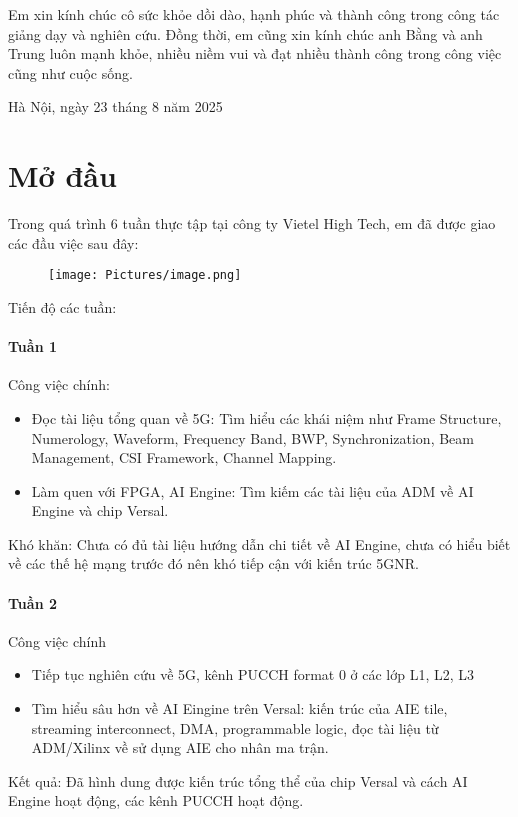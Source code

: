 \documentclass[13pt]{report}
\begin{document}
Em xin kính chúc cô sức khỏe dồi dào, hạnh phúc và thành công trong công tác giảng dạy và nghiên cứu. Đồng thời, em cũng xin kính chúc anh Bằng và anh Trung luôn mạnh khỏe, nhiều niềm vui và đạt nhiều thành công trong công việc cũng như cuộc sống.

\hspace{8cm} Hà Nội, ngày 23 tháng 8 năm 2025


\newpage
\let\cleardoublepage\clearpage
\large
\tableofcontents
\let\cleardoublepage\clearpage
\newpage
{}
\listoffigures 
\newpage
\listoftables

\chapter{Mở đầu}
Trong quá trình 6 tuần thực tập tại công ty Vietel High Tech, em đã được giao các đầu việc sau đây:
\begin{figure}[H]
    \centering
    \texttt{[image: Pictures/image.png]}
\end{figure}
Tiến độ các tuần: 
\subsubsection{Tuần 1}
Công việc chính: 
\begin{itemize}
    \item Đọc tài liệu tổng quan về 5G: Tìm hiểu các khái niệm như Frame Structure, Numerology, Waveform, Frequency Band, BWP, Synchronization, Beam Management, CSI Framework, Channel Mapping.
    \item Làm quen với FPGA, AI Engine: Tìm kiếm các tài liệu của ADM về AI Engine và chip Versal. 
\end{itemize}
Khó khăn: Chưa có đủ tài liệu hướng dẫn chi tiết về AI Engine, chưa có hiểu biết về các thế hệ mạng trước đó nên khó tiếp cận với kiến trúc 5GNR.
\subsubsection{Tuần 2}
Công việc chính
\begin{itemize}
    \item Tiếp tục nghiên cứu về 5G, kênh PUCCH format 0 ở các lớp L1, L2, L3
    \item Tìm hiểu sâu hơn về AI Eingine trên Versal: kiến trúc của AIE tile, streaming interconnect, DMA, programmable logic, đọc tài liệu từ ADM/Xilinx về sử dụng AIE cho nhân ma trận.
\end{itemize}
Kết quả: Đã hình dung được kiến trúc tổng thể của chip Versal và cách AI Engine hoạt động, các kênh PUCCH hoạt động.
\end{document}

